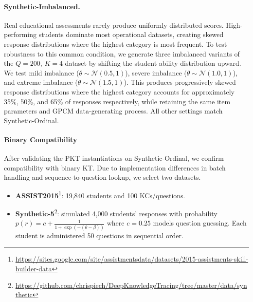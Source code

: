 \documentclass[pdflatex,sn-apa]{sn-jnl}
\begin{document}
\paragraph{Synthetic-Imbalanced.}
Real educational assessments rarely produce uniformly distributed scores. High-performing students dominate most operational datasets, creating skewed response distributions where the highest category is most frequent. To test robustness to this common condition, we generate three imbalanced variants of the $Q=200$, $K=4$ dataset by shifting the student ability distribution upward. We test mild imbalance ($\theta \sim \mathcal{N}(0.5, 1)$), severe imbalance ($\theta \sim \mathcal{N}(1.0, 1)$), and extreme imbalance ($\theta \sim \mathcal{N}(1.5, 1)$). This produces progressively skewed response distributions where the highest category accounts for approximately 35\%, 50\%, and 65\% of responses respectively, while retaining the same item parameters and GPCM data-generating process. All other settings match Synthetic-Ordinal.

\paragraph{Binary Compatibility}
After validating the PKT instantiations on Synthetic-Ordinal, we confirm compatibility with binary KT. Due to implementation differences in batch handling and sequence-to-question lookup, we select two datasets.
\begin{itemize}
    \item \textbf{ASSIST2015}\footnote{\url{https://sites.google.com/site/assistmentsdata/datasets/2015-assistments-skill-builder-data}}: 19,840 students and 100 KCs/questions.
    \item \textbf{Synthetic-5}\footnote{\url{https://github.com/chrispiech/DeepKnowledgeTracing/tree/master/data/synthetic}}: \citep{piech_deep_2015} simulated 4,000 students' responses with probability $p(r)=c+\frac{1}{1+\exp(-(\theta-\beta))}$ where $c=0.25$ models question guessing. Each student is administered 50 questions in sequential order.
\end{itemize}
\end{document}
